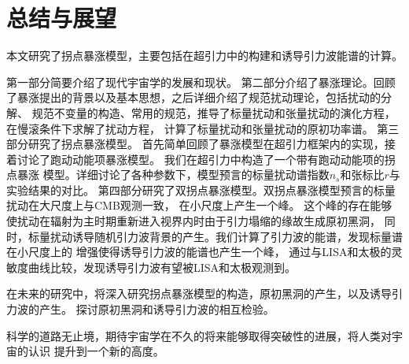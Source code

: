 \chapter{总结与展望}%
\label{chap:summary}
本文研究了拐点暴涨模型，主要包括在超引力中的构建和诱导引力波能谱的计算。

第一部分简要介绍了现代宇宙学的发展和现状。
第二部分介绍了暴涨理论。回顾了暴涨提出的背景以及基本思想，之后详细介绍了规范扰动理论，包括扰动的分解、
规范不变量的构造、常用的规范，推导了标量扰动和张量扰动的演化方程，在慢滚条件下求解了扰动方程，
计算了标量扰动和张量扰动的原初功率谱。
第三部分研究了拐点暴涨模型。
首先简单回顾了暴涨模型在超引力框架内的实现，接着讨论了跑动动能项暴涨模型。
我们在超引力中构造了一个带有跑动动能项的拐点暴涨
模型。详细讨论了各种参数下，模型预言的标量扰动谱指数$n_s$和张标比$r$与实验结果的对比。
第四部分研究了双拐点暴涨模型。双拐点暴涨模型预言的标量扰动在大尺度上与CMB观测一致，
在小尺度上产生一个峰。
这个峰的存在能够使扰动在辐射为主时期重新进入视界内时由于引力塌缩的缘故生成原初黑洞，
同时，标量扰动诱导随机引力波背景的产生。我们计算了引力波的能谱，发现标量谱在小尺度上的
增强使得诱导引力波的能谱也产生一个峰，
通过与LISA和太极的灵敏度曲线比较，发现诱导引力波有望被LISA和太极观测到。

在未来的研究中，将深入研究拐点暴涨模型的构造，原初黑洞的产生，以及诱导引力波的产生。
探讨原初黑洞和诱导引力波的相互检验。

科学的道路无止境，期待宇宙学在不久的将来能够取得突破性的进展，将人类对宇宙的认识
提升到一个新的高度。

